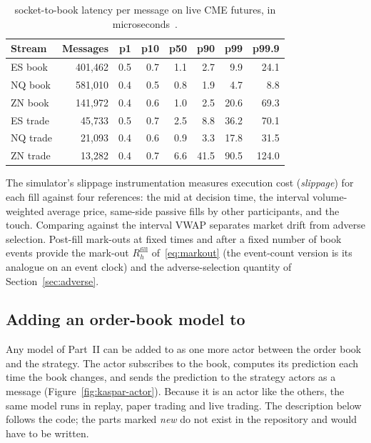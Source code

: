 \begin{table}[!htbp]
\centering\small
\caption{\kasparhft{} socket-to-book latency per message on live CME futures, in microseconds~\citep{kaspar_hft}.}
\label{tab:kaspar-latency}
\begin{tabular}{lrrrrrrr}
\toprule
Stream & Messages & p1 & p10 & p50 & p90 & p99 & p99.9 \\
\midrule
ES book & 401,462 & 0.5 & 0.7 & 1.1 & 2.7 & 9.9 & 24.1 \\
NQ book & 581,010 & 0.4 & 0.5 & 0.8 & 1.9 & 4.7 & 8.8 \\
ZN book & 141,972 & 0.4 & 0.6 & 1.0 & 2.5 & 20.6 & 69.3 \\
ES trade & 45,733 & 0.5 & 0.7 & 2.5 & 8.8 & 36.2 & 70.1 \\
NQ trade & 21,093 & 0.4 & 0.6 & 0.9 & 3.3 & 17.8 & 31.5 \\
ZN trade & 13,282 & 0.4 & 0.7 & 6.6 & 41.5 & 90.5 & 124.0 \\
\bottomrule
\end{tabular}
\end{table}

The simulator's slippage instrumentation measures execution cost (\emph{slippage}) for each fill against four
references: the mid at decision time, the interval volume-weighted average price, same-side
passive fills by other participants, and the touch. Comparing against the interval VWAP separates
market drift from adverse selection. Post-fill mark-outs at fixed times and after a fixed number
of book events provide the mark-out $R^{\text{fill}}_{h}$ of~\eqref{eq:markout} (the event-count version is
its analogue on an event clock) and the adverse-selection quantity of Section~\ref{sec:adverse}.

\subsection{Adding an order-book model to \kasparhft{}}
\label{sec:kaspar-actor}

Any model of Part~II can be added to \kasparhft{} as one more actor between the order book and the strategy. The actor
subscribes to the book, computes its prediction each time the book changes, and sends the prediction to the
strategy actors as a message (Figure~\ref{fig:kaspar-actor}). Because it is an actor like the others, the same model
runs in replay, paper trading and live trading. The description below follows the code; the parts marked
\emph{new} do not exist in the repository and would have to be written.

